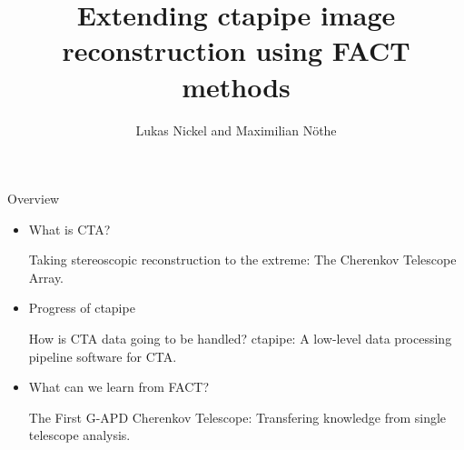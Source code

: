 \documentclass[aspectratio=1610, 10pt]{beamer}
\title{Extending ctapipe image reconstruction using FACT methods}
\author[L Nickel/M.~Nöthe]{Lukas Nickel and Maximilian Nöthe}
\begin{document}
\maketitle

\begin{frame}{Overview}
 \begin{itemize}
    \item {\Large What is CTA?}

    Taking stereoscopic reconstruction to the extreme:
    The Cherenkov Telescope Array.
    \vspace{20pt}

    \item {\Large Progress of ctapipe}

    How is CTA data going to be handled?
    ctapipe: A low-level data processing pipeline software for CTA.
    \vspace{20pt}

    \item {\Large What can we learn from FACT?}
    
    The First G-APD Cherenkov Telescope:
    Transfering knowledge from single telescope analysis.
    

 \end{itemize}
\end{frame}







\printbibliography
\end{document}
